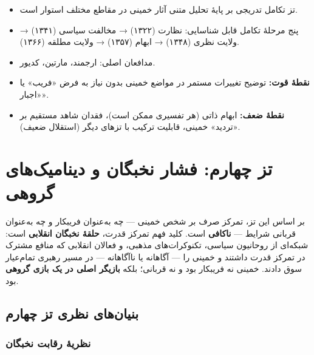 \documentclass[12pt,a4paper]{book}
\newcommand{\keyword}[1]{\textbf{\textcolor{cPrimary}{#1}}}
\begin{document}
\begin{principleBox}
\begin{itemize}[label=\textcolor{cPrimary}{$\blacksquare$}, rightmargin=2em]
    \item تز تکامل تدریجی بر پایهٔ تحلیل متنی آثار خمینی در مقاطع مختلف استوار است.
    \item پنج مرحلهٔ تکامل قابل شناسایی: نظارت (۱۳۲۲) → مخالفت سیاسی (۱۳۴۱) → ولایت نظری (۱۳۴۸) → ابهام (۱۳۵۷) → ولایت مطلقه (۱۳۶۶).
    \item مدافعان اصلی: ارجمند، مارتین، کدیور.
    \item \keyword{نقطهٔ قوت:} توضیح تغییرات مستمر در مواضع خمینی بدون نیاز به فرض «فریب» یا «اجبار».
    \item \keyword{نقطهٔ ضعف:} ابهام ذاتی (هر تفسیری ممکن است)، فقدان شاهد مستقیم بر «تردید» خمینی، قابلیت ترکیب با تزهای دیگر (استقلال ضعیف).
\end{itemize}
\end{principleBox}


\chapter{تز چهارم: فشار نخبگان و دینامیک‌های گروهی}

\begin{infoBox}
بر اساس این تز، تمرکز صرف بر شخص خمینی — چه به‌عنوان فریبکار و چه به‌عنوان قربانی شرایط — \keyword{ناکافی} است. کلید فهم تمرکز قدرت، \keyword{حلقهٔ نخبگان انقلابی} است: شبکه‌ای از روحانیون سیاسی، تکنوکرات‌های مذهبی، و فعالان انقلابی که منافع مشترک در تمرکز قدرت داشتند و خمینی را — آگاهانه یا ناآگاهانه — در مسیر رهبری تمام‌عیار سوق دادند. خمینی نه فریبکار بود و نه قربانی؛ بلکه \keyword{بازیگر اصلی در یک بازی گروهی} بود.
\end{infoBox}

\section{بنیان‌های نظری تز چهارم}

\subsection{نظریهٔ رقابت نخبگان}
\end{document}
